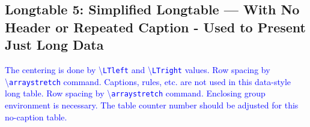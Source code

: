 \documentclass[phd]{ndsu-thesis-2022}
\newcommand\italk[1]{\textcolor{blue}{#1}}  %
\newcommand\cmd[1]{\textbackslash\texttt{#1}}  %
\begin{document}
\subsection{Longtable 5: Simplified Longtable --- With No Header or Repeated Caption - Used to Present Just Long Data}

\italk{The centering is done by \cmd{LTleft} and \cmd{LTright} values. Row spacing by \cmd{arraystretch} command. Captions, rules, etc. are not used in this data-style long table. Row spacing by \cmd{arraystretch} command. Enclosing group environment is necessary. The table counter number should be adjusted for this no-caption table.}

\begingroup
\setlength{\LTleft}{0.5cm plus -1fill}%
\setlength{\LTright}{\LTleft}%
\renewcommand{\arraystretch}{0.6}%
\end{document}
